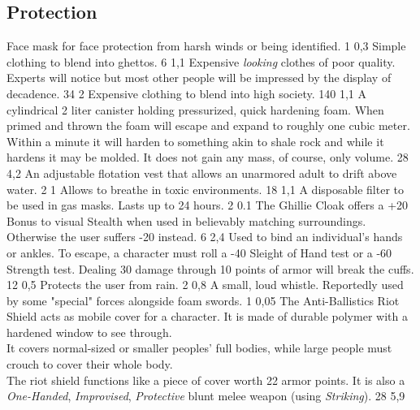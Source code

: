 \subsection{Protection}
\vspace{10mm}
\begin{multicols}{2}
    {Face mask for face protection from harsh winds or being identified.}
    {1}
    {0,3}
    {Simple clothing to blend into ghettos.}
    {6}
    {1,1}
    {Expensive \emph{looking} clothes of poor quality.
        Experts will notice but most other people will be impressed by the display of decadence.}
    {34}
    {2}
    {Expensive clothing to blend into high society.}
    {140}
    {1,1}
    {A cylindrical 2 liter canister holding pressurized, quick hardening foam.
        When primed and thrown the foam will escape and expand to roughly one cubic meter.
        Within a minute it will harden to something akin to shale rock and while it hardens it may be molded.
        It does not gain any mass, of course, only volume.}
    {28}
    {4,2}
    {An adjustable flotation vest that allows an unarmored adult to drift above water.}
    {2}
    {1}
    {Allows to breathe in toxic environments.}
    {18}
    {1,1}
    {A disposable filter to be used in gas masks.
        Lasts up to 24 hours.}
    {2}
    {0.1}
    {The Ghillie Cloak offers a +20 Bonus to visual Stealth when used in believably matching surroundings.
        Otherwise the user suffers -20 instead.}
    {6}
    {2,4}
    {Used to bind an individual’s hands or ankles.
        To escape, a character must roll a -40 Sleight of Hand test or a -60 Strength test.
        Dealing 30 damage through 10 points of armor will break the cuffs.}
    {12}
    {0,5}
    {Protects the user from rain.}
    {2}
    {0,8}
    {A small, loud whistle. Reportedly used by some "special" forces alongside foam swords.}
    {1}
    {0,05}
    {The Anti-Ballistics Riot Shield acts as mobile cover for a character.
        It is made of durable polymer with a hardened window to see through.\\
        It covers normal-sized or smaller peoples' full bodies,
        while large people must crouch to cover their whole body.\\
        The riot shield functions like a piece of cover worth 22 armor points.
    	It is also a
    		\emph{One-Handed},
    		\emph{Improvised},
    		\emph{Protective}
    		blunt melee weapon
    		(using \emph{Striking}).
	}
    {28}
    {5,9}
\end{multicols}

